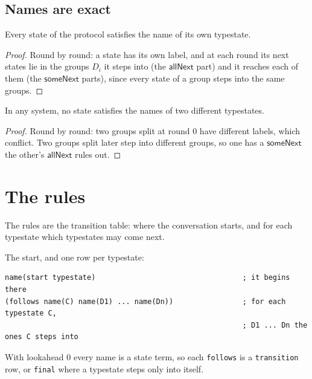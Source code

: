 \begin{lemma}\label{lem:own}
\subsection{Names are exact}

Every state of the protocol satisfies the name of its own typestate.
\end{lemma}

\begin{proof}
Round by round: a state has its own label, and at each round its next states lie in the
groups $D_i$ it steps into (the $\mathsf{allNext}$ part) and it reaches each of them (the
$\mathsf{someNext}$ parts), since every state of a group steps into the same groups.
\end{proof}

\begin{lemma}\label{lem:exclusive}
In any system, no state satisfies the names of two different typestates.
\end{lemma}

\begin{proof}
Round by round: two groups split at round $0$ have different labels, which conflict. Two
groups split later step into different groups, so one has a $\mathsf{someNext}$ the other's
$\mathsf{allNext}$ rules out.
\end{proof}

\section{The rules}

The rules are the transition table: where the conversation starts, and for each typestate
which typestates may come next.

\begin{definition}\label{def:rules}
The start, and one row per typestate:
\begin{lstlisting}[language={},basicstyle=\ttfamily\footnotesize]
name(start typestate)                                  ; it begins there
(follows name(C) name(D1) ... name(Dn))                ; for each typestate C,
                                                       ; D1 ... Dn the ones C steps into
\end{lstlisting}
With lookahead $0$ every name is a state term, so each \texttt{follows} is a
\texttt{transition} row, or \texttt{final} where a typestate steps only into itself.
\end{definition}

